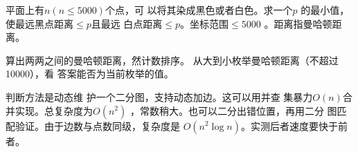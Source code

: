 \begin{prob}
	平面上有$n(n \le 5000)$个点，可
	以将其染成黑色或者白色。求一个$p$
	的最小值，使最远黑点距离$\le p$且最远
	白点距离$\le p$。坐标范围$ \le 5000$
	。距离指曼哈顿距离。
\end{prob}

\begin{sol}
	算出两两之间的曼哈顿距离，然计数排序。
	从大到小枚举曼哈顿距离（不超过10000），看
	答案能否为当前枚举的值。
	\par
	判断方法是动态维
	护一个二分图，支持动态加边。这可以用并查
	集暴力$O(n)$合并实现。总复杂度为$O(n^2)$
	，常数稍大。也可以二分出错位置，再用二分
	图匹配验证。由于边数与点数同级，复杂度是
	$O(n^2 \log n)$。实测后者速度要快于前者。
\end{sol}
